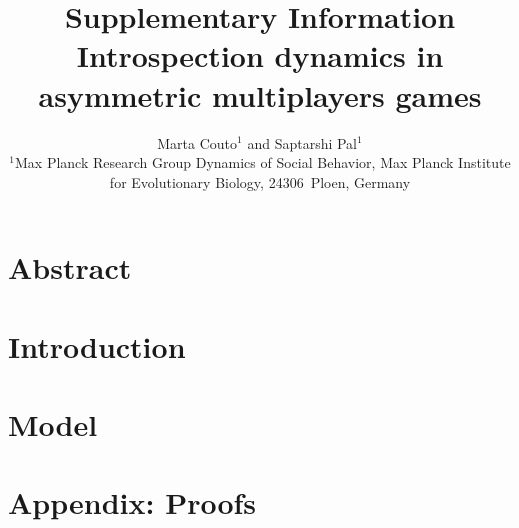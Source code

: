 \documentclass[11pt]{article}
\title{\sffamily \Large Supplementary Information\\[0.1cm] {\bfseries Introspection dynamics in asymmetric multiplayers games}}
\date{\empty}
\author{\parbox[c]{16cm}{\centering \onehalfspacing \fontsize{11}{12}\selectfont Marta Couto$^1$ and Saptarshi Pal$^1$\\[0.2cm]
$^1$Max Planck Research Group Dynamics of Social Behavior, Max Planck Institute for Evolutionary Biology, 24306~Ploen, Germany}}
\theoremstyle{plainCl1}
\theoremstyle{plainCl2}
\begin{document}
\maketitle
\onehalfspacing
\section*{Abstract}
\newpage
\section*{Introduction}
\section*{Model}
\newpage
\section*{Appendix: Proofs}
\label{Section:Appendix}
\end{document}
